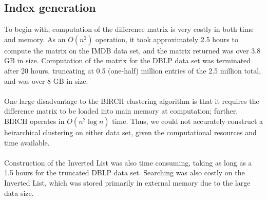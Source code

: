 \documentclass[pdftex,12pt,letter]{article}
\begin{document}
\subsection{Index generation}
To begin with, computation of the difference matrix is very costly in both time and memory. As an $O(n^2)$ operation, it took approximately 2.5 hours to compute the matrix on the IMDB data set, and the matrix returned was over 3.8 GB in size. Computation of the matrix for the DBLP data set was terminated after 20 hours, truncating at 0.5 (one-half) million entries of the 2.5 million total, and was over 8 GB in size.\\
\\
One large disadvantage to the BIRCH clustering algorithm is that it requires the difference matrix to be loaded into main memory at computation; further, BIRCH operates in $O(n^2\log{n})$ time. Thus, we could not accurately construct a heirarchical clustering on either data set, given the computational resources and time available.\\
\\
Construction of the Inverted List was also time consuming, taking as long as a 1.5 hours for the truncated DBLP data set. Searching was also costly on the Inverted List, which was stored primarily in external memory due to the large data size. 
\end{document}
